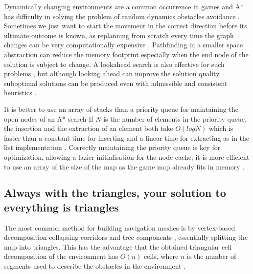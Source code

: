\documentclass{scrartcl}
\begin{document}
Dynamically changing environments \cite{botea2011ultra} are a common occurrence in games and A* has difficulty in solving the problem of random dynamics obstacles avoidance \cite{wang2012game}.  Sometimes we just want to start the movement in the correct direction before its ultimate outcome is known, as replanning from scratch every time the graph changes can be very computationally expensive \cite{ferguson2005guide}.  Pathfinding in a smaller space abstraction can reduce the memory footprint \cite{lawrence2013database} especially when the end node of the solution is subject to change.  A lookahead search is also effective for such problems \cite{korf1990real}, but although looking ahead can improve the solution quality, suboptimal solutions can be produced even with admissible and consistent heuristics \cite{bulitko2003lookahead}.

It is better to use an array of stacks than a priority queue for maintaining the open nodes of an A* search If $N$ is the number of elements in the priority queue, the insertion and the extraction of an element both take $O(log N)$ which is faster than a constant time for inserting and a linear time for extracting as in the list implementation \cite{cazenave2006optimizations}.  Correctly maintaining the priority queue is key for optimization, allowing a lazier initialisation for the node cache; it is more efficient to use an array of the size of the map as the game map already fits in memory \cite{cazenave2006optimizations}.

\subsection*{Always with the triangles, your solution to everything is triangles}

The most common method for building navigation meshes is by vertex-based decomposition \cite{hale2009full} collapsing corridors and tree components \cite{demyen2006efficient}, essentially splitting the map into triangles.  This has the advantage that the obtained triangular cell decomposition of the environment has $O(n)$ cells, where $n$ is the number of segments used to describe the obstacles in the environment \cite{kallmann2010navigation}.




\end{document}
